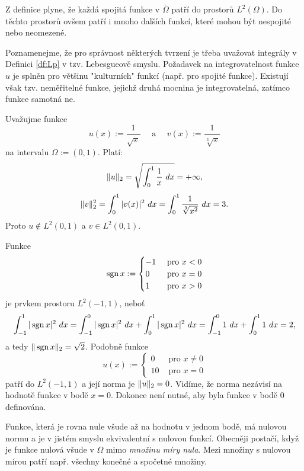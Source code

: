 Z definice plyne, že každá spojitá funkce v $\overline\Omega$ patří do prostorů $L^2(\Omega)$.
Do těchto prostorů ovšem patří i mnoho dalších funkcí, které mohou být nespojité nebo neomezené.

Poznamenejme, že pro správnost některých tvrzení je třeba uvažovat integrály v Definici \ref{df:Lp} v tzv. Lebesgueově smyslu.
Požadavek na integrovatelnost funkce $u$ je splněn pro většinu "kulturních" funkcí (např. pro spojité funkce).
Existují však tzv. neměřitelné funkce, jejichž druhá mocnina je integrovatelná, zatímco funkce samotná ne.


\begin{ex}
Uvažujme funkce
\[ u(x) := \frac1{\sqrt{x}} \quad\mbox{ a }\quad v(x) := \frac1{\sqrt[3]{x}} \]
na intervalu $\Omega:=(0,1)$.
Platí:
\[ \|u\|_2 = \sqrt{\int_0^1 \frac1x~dx} = +\infty, \]
\[ \|v\|_2^2 = \int_0^1 |v(x)|^2~dx = \int_0^1 \frac1{\sqrt[3]{x^2}}~dx = 3. \]
Proto $u\notin L^2(0,1)$ a $v\in L^2(0,1)$.
\end{ex}

\begin{ex}
Funkce
\[ \operatorname{sgn} x:=\begin{cases}-1 & \mbox{ pro }x<0\\0 & \mbox{ pro }x=0\\1 & \mbox{ pro }x>0\end{cases} \]
je prvkem prostoru $L^2(-1,1)$, neboť
\[ \int_{-1}^1 |\operatorname{sgn} x|^2~dx = \int_{-1}^0 |\operatorname{sgn} x|^2 ~dx + \int_0^1 |\operatorname{sgn} x|^2~dx = \int_{-1}^0 1~dx + \int_0^1 1~dx = 2, \]
a tedy $\|\operatorname{sgn} x\|_2 = \sqrt{2}$.
Podobně funkce
\[ u(x) := \begin{cases}0 & \mbox{ pro }x\neq 0\\10 & \mbox{ pro }x=0\end{cases} \]
patří do $L^2(-1,1)$ a její norma je $\|u\|_2=0$.
Vidíme, že norma nezávisí na hodnotě funkce v bodě $x=0$. Dokonce není nutné, aby byla funkce v bodě 0 definována.
\end{ex}

Funkce, která je rovna nule všude až na hodnotu v jednom bodě, má nulovou normu a je v jistém smyslu ekvivalentní s nulovou funkcí.
Obecněji postačí, když je funkce nulová všude v $\Omega$ mimo \emph{množinu míry nula}.
Mezi množiny s nulovou mírou patří např. všechny konečné a spočetné množiny.

